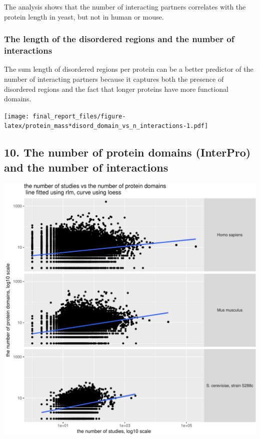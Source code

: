 \documentclass[]{article}
\begin{document}
The analysis shows that the number of interacting partners correlates
with the protein length in yeast, but not in human or mouse.

\subsubsection{The length of the disordered regions and the number of
interactions}\label{the-length-of-the-disordered-regions-and-the-number-of-interactions}

The sum length of disordered regions per protein can be a better
predictor of the number of interacting partners because it captures both
the presence of disordered regions and the fact that longer proteins
have more functional domains.

\texttt{[image: final\_report\_files/figure-latex/protein\_mass*disord\_domain\_vs\_n\_interactions-1.pdf]}

\subsection{10. The number of protein domains (InterPro) and the number
of
interactions}\label{the-number-of-protein-domains-interpro-and-the-number-of-interactions}

\includegraphics{final_report_files/figure-latex/N_domain_vs_n_publications-1.pdf}
\end{document}
